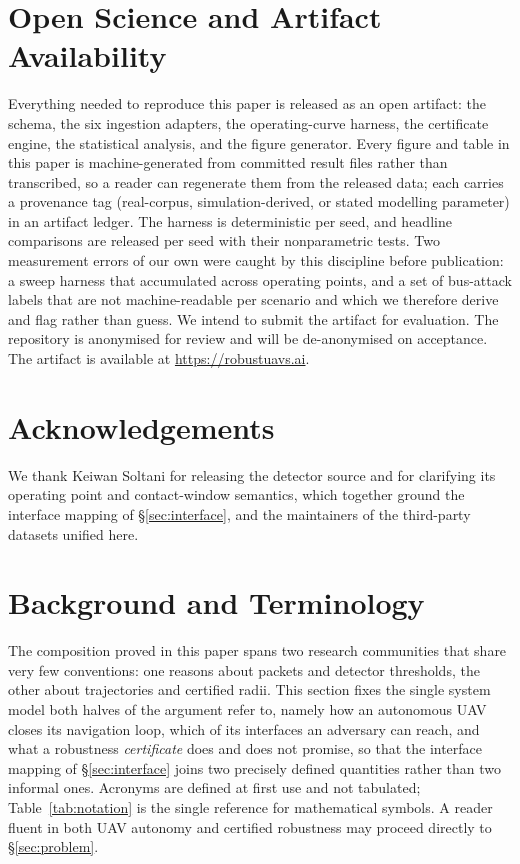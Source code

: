 \section{Open Science and Artifact Availability}
\label{sec:openscience}
Everything needed to reproduce this paper is released as an open artifact: the
schema, the six ingestion adapters, the operating-curve harness, the
certificate engine, the statistical analysis, and the figure generator. Every
figure and table in this paper is machine-generated from committed result files
rather than transcribed, so a reader can regenerate them from the released data;
each carries a provenance tag (real-corpus, simulation-derived, or stated
modelling parameter) in an artifact ledger. The harness is deterministic per
seed, and headline comparisons are released per seed with their nonparametric
tests. Two measurement errors of our own were caught by this discipline before
publication: a sweep harness that accumulated across operating points, and a set
of bus-attack labels that are not machine-readable per scenario and which we
therefore derive and flag rather than guess. We intend to submit the artifact for evaluation.
\ifanon
The repository is anonymised for review and will be de-anonymised on acceptance.
\else
The artifact is available at \url{https://robustuavs.ai}.
\fi

\ifanon\else

\section*{Acknowledgements}
We thank Keiwan Soltani for releasing the  detector source and
for clarifying its operating point and contact-window semantics, which together
ground the interface mapping of \S\ref{sec:interface}, and the maintainers of
the third-party datasets unified here.
\fi




\appendix

\section{Background and Terminology}
\label{sec:background}
The composition proved in this paper spans two research communities that share
very few conventions: one reasons about packets and detector thresholds, the
other about trajectories and certified radii. This section fixes the single
system model both halves of the argument refer to, namely how an autonomous UAV closes
its navigation loop, which of its interfaces an adversary can reach, and what a
robustness \emph{certificate} does and does not promise, so that the interface
mapping of \S\ref{sec:interface} joins two precisely defined quantities rather
than two informal ones. Acronyms are defined at first use and not tabulated;
Table~\ref{tab:notation} is the single reference for mathematical symbols. A
reader fluent in both UAV autonomy and certified robustness may proceed directly
to \S\ref{sec:problem}.

